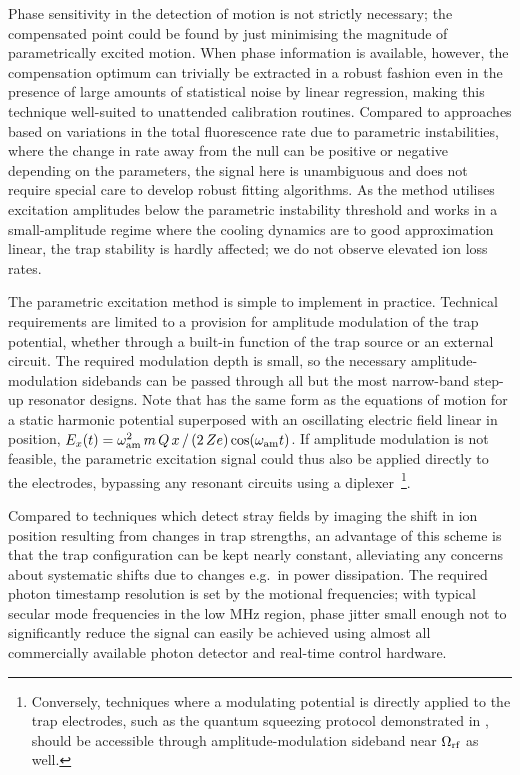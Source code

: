 \documentclass[pra,twocolumn]{revtex4-2}
\begin{document}
Phase sensitivity in the detection of motion is not strictly necessary; the compensated point could be found by just minimising the magnitude of parametrically excited motion.
When phase information is available, however, the compensation optimum can trivially be extracted in a robust fashion even in the presence of large amounts of statistical noise by linear regression, making this technique well-suited to unattended calibration routines.
Compared to approaches based on variations in the total fluorescence rate due to parametric instabilities, where the change in rate away from the \RF{} null can be positive or negative depending on the parameters, the signal here is unambiguous and does not require special care to develop robust fitting algorithms.
As the method utilises excitation amplitudes below the parametric instability threshold and works in a small-amplitude regime where the cooling dynamics are to good approximation linear, the trap stability is hardly affected; we do not observe elevated ion loss rates.

The parametric excitation method is simple to implement in practice. Technical requirements are limited to a provision for amplitude modulation of the trap potential, whether through a built-in function of the trap \RF{} source or an external circuit.
The required modulation depth is small, so the necessary amplitude-modulation sidebands can be passed through all but the most narrow-band step-up resonator designs.
Note that  has the same form as the equations of motion for a static harmonic potential superposed with an oscillating electric field linear in position, $E_x(t) = \omega_{\textrm{am}}^2\, m\, Q\, x\, /\, (2\, Z e) \cos(\omega_{\textrm{am}} t)$.
If amplitude modulation is not feasible, the parametric excitation signal could thus also be applied directly to the \RF{} electrodes, bypassing any resonant circuits using a diplexer~\footnote{Conversely, techniques where a modulating potential is directly applied to the trap \RF{} electrodes, such as the quantum squeezing protocol demonstrated in , should be accessible through amplitude-modulation sideband near $\Omega_{\textrm{rf}}$ as well.}.

Compared to techniques which detect stray fields by imaging the shift in ion position resulting from changes in \RF{} trap strengths, an advantage of this scheme is that the trap configuration can be kept nearly constant, alleviating any concerns about systematic shifts due to changes e.g.~in power dissipation.
The required photon timestamp resolution is set by the motional frequencies; with typical secular mode frequencies in the low \si{\mega\hertz} region, phase jitter small enough not to significantly reduce the signal can easily be achieved using almost all commercially available photon detector and real-time control hardware.
\end{document}
